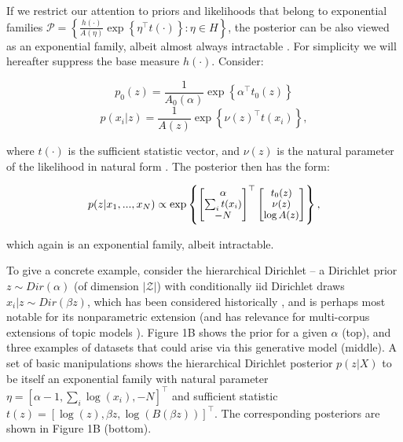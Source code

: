 \documentclass[twoside]{article}
\begin{document}
If we restrict our attention to priors and likelihoods that belong to exponential families $\mathcal{P} = \left\{ \frac{h(\cdot)}{A(\eta)} \exp\left\{ \eta^\top t(\cdot) \right \} : \eta \in H \right\}$, the posterior can be also viewed as an exponential family, albeit almost always intractable \citep{wainwright2008graphical}.  For simplicity we will hereafter suppress the base measure $h(\cdot)$.  Consider:

{\small 
\begin{equation}
 p_0(z) = \frac{1}{A_0(\alpha)} \exp\left\{ \alpha^\top t_0(z) \right\} 
 \label{eq:1}
 \end{equation}
 \begin{equation}
 p(x_i|z) = \frac{1}{A(z)} \exp\left\{ \nu(z)^\top t(x_i) \right \},
\label{eq:2}
 \end{equation} }


where $t(\cdot)$ is the sufficient statistic vector, and $\nu(z)$ is the natural parameter of the likelihood in natural form \citep{robert2007bayesian}.   The posterior then has the form:

\begin{equation}
{\small
  p(z | x_1,...,x_N)  \propto  \exp\left\{ \begin{bmatrix} \alpha \\ \sum_i t(x_i) \\ -N \end{bmatrix}^\top\begin{bmatrix} t_0(z) \\ \nu(z) \\ \log A(z) \end{bmatrix} \right\},
  }
\label{eq:3}
\end{equation}

which again is an exponential family, albeit intractable.

To give a concrete example, consider the hierarchical Dirichlet -- a Dirichlet prior $z\sim Dir(\alpha)$ (of dimension $|\mathcal{Z}|$) with conditionally iid Dirichlet draws $x_i | z \sim Dir(\beta z)$, which has been considered historically \citep{mackay1995hierarchical}, and is perhaps most notable for its nonparametric extension \citep{teh2006hdp} (and has relevance for multi-corpus extensions of topic models \citep{blei2003latent, pritchard2000inference}).  
Figure 1B shows the prior for a given $\alpha$ (top), and three examples of datasets that could arise via this generative model (middle).  
A set of basic manipulations shows the hierarchical Dirichlet posterior $p(z|X)$ to be itself an exponential family with natural parameter $\eta = \left[ \alpha -1 , \sum_i \log(x_i) , -N \right]^\top$ and sufficient statistic $t(z) = \left[ \log(z), \beta z , \log(B(\beta z)) \right]^\top$.%
The corresponding posteriors are shown in Figure 1B (bottom).  
\end{document}
